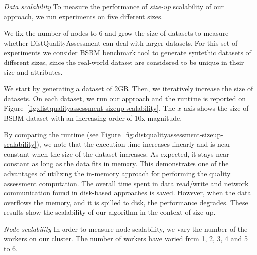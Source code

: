 \textit{Data scalability} 
To measure the performance of \textit{size-up} scalability of our approach, we run experiments on five different sizes.

We fix the number of nodes to 6 and grow the size of datasets to measure whether DistQualityAssessment can deal with larger datasets.
For this set of experiments we consider BSBM benchmark tool to generate syntethic datasets of different sizes, since the real-world dataset are considered to be unique in their size and attributes.

We start by generating a dataset of 2GB.
Then, we iteratively increase the size of datasets.
On each dataset, we run our approach and the runtime is reported on Figure~\ref{fig:distqualityassessment-sizeup-scalability}.
The $x$-axis shows the size of BSBM dataset with an increasing order of 10x magnitude.

By comparing the runtime (see Figure~\ref{fig:distqualityassessment-sizeup-scalability}), we note that the execution time increases linearly and is near-constant when the size of the dataset increases.
As expected, it stays near-constant as long as the data fits in memory.
This demonstrates one of the advantages of utilizing the in-memory approach for performing the quality assessment computation.
The overall time spent in data read/write and network communication found in disk-based approaches is saved.
However, when the data overflows the memory, and it is spilled to disk, the performance degrades.
These results show the scalability of our algorithm in the context of size-up.

\textit{Node scalability} In order to measure node scalability, we vary the number of the workers on our cluster.
The number of workers have varied from 1, 2, 3, 4 and 5 to 6.

